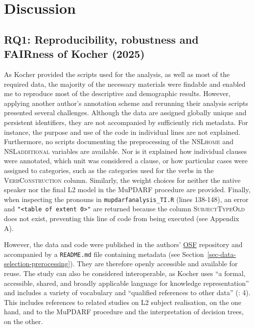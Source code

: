 \documentclass[
  letterpaper,
  DIV=11,
  numbers=noendperiod]{scrartcl}
\begin{document}
\section{Discussion}\label{sec-Discussion}

\subsection{RQ1: Reproducibility, robustness and FAIRness of Kocher
(2025)}\label{sec-evaluation-FAIRness}

As Kocher provided the scripts used for the analysis, as well as most of
the required data, the majority of the necessary materials were findable
and enabled me to reproduce most of the descriptive and demographic
results. However, applying another author's annotation scheme and
rerunning their analysis scripts presented several challenges. Although
the data are assigned globally unique and persistent identifiers, they
are not accompanied by sufficiently rich metadata. For instance, the
purpose and use of the code in individual lines are not explained.
Furthermore, no scripts documenting the preprocessing of the
\textsc{NSLhome} and \textsc{NSLadditional} variables are available. Nor
is it explained how individual clauses were annotated, which unit was
considered a clause, or how particular cases were assigned to
categories, such as the categories used for the verbs in the
\textsc{VerbConstruction} column. Similarly, the weight choices for
neither the native speaker nor the final L2 model in the MuPDARF
procedure are provided. Finally, when inspecting the pronouns in
\texttt{mupdarfanalysis\_TI.R} (lines 138-148), an error and
\texttt{"\textless{}table\ of\ extent\ 0\textgreater{}"} are returned
because the column \textsc{SubjectTypeOld} does not exist, preventing
this line of code from being executed (see Appendix A).

However, the data and code were published in the authors'
\href{https://osf.io/zr9wh/overview}{OSF} repository and accompanied by
a \texttt{README.md} file containing metadata (see
Section~\ref{sec-data-selection-prerocessing}). They are therefore
openly accessible and available for reuse. The study can also be
considered interoperable, as Kocher uses ``a formal, accessible, shared,
and broadly applicable language for knowledge representation'' and
includes a variety of vocabulary and ``qualified references to other
data'' (: 4). This
includes references to related studies on L2 subject realisation, on the
one hand, and to the MuPDARF procedure and the interpretation of
decision trees, on the other.
\end{document}

